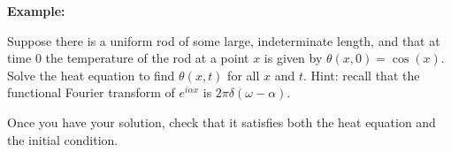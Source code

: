 \documentclass{article}
\begin{document}
\clearpage



\textbf{Example:}\bigskip


Suppose there is a uniform rod of some large, indeterminate length, and that at time $0$ the temperature of the rod at a point $x$ is given by $\theta(x,0)=\cos(x)$. Solve the heat equation to find $\theta(x,t)$ for all $x$ and $t$. Hint: recall that the functional Fourier transform of $e^{i\alpha x}$ is $2\pi\delta(\omega-\alpha)$.

Once you have your solution, check that it satisfies both the heat equation and the initial condition.
\end{document}
